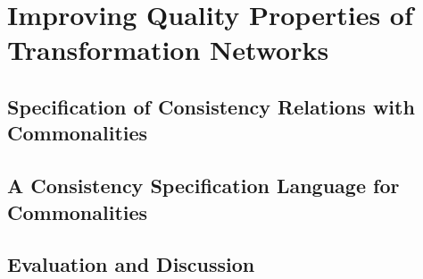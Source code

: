 \part{Improving Quality Properties of Transformation Networks }
\chapter{Specification of Consistency Relations with Commonalities }
\chapter{A Consistency Specification Language for Commonalities }
\chapter{Evaluation and Discussion }